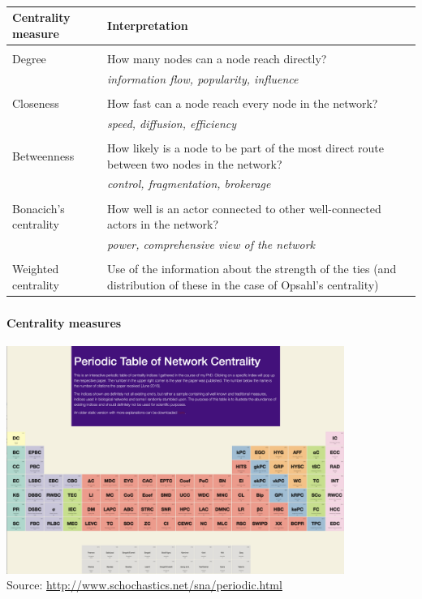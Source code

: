 \documentclass[8pt]{beamer}
\begin{document}
\begin{frame}
\frametitle{\insertsection}
\framesubtitle{\insertsubsection}

\small
\begin{table}
\begin{tabular}{p{3cm}p{7.5cm}}
\toprule
\textbf{Centrality measure} 	&	\textbf{Interpretation} \\
\hline
\\
Degree 		&	How many nodes can a node reach directly?\\
			&	\textit{\color{blue}information flow, popularity, influence}\\
\\
Closeness        &	    How fast can a node reach every node in the network?\\
			&	\textit{\color{blue}speed, diffusion, efficiency}\\
\\
Betweenness        &	How likely is a node to be part of the most direct route between two nodes in the network?\\
			&	\textit{\color{blue}control, fragmentation, brokerage}\\
\\
Bonacich's centrality 	&	How well is an actor connected to other well-connected actors in the network?\\ 
			&	\textit{\color{blue}power, comprehensive view of the network}\\
\\
Weighted centrality     & Use of the information about the strength of the ties (and distribution of these in the case of Opsahl's centrality)\\
\bottomrule
\end{tabular}
\end{table}
\end{frame}


\begin{frame}
\frametitle{\insertsection}
\framesubtitle{Centrality measures}

\centering  
\includegraphics[width=11cm, frame]{periodic}\\
\tiny Source: \url{http://www.schochastics.net/sna/periodic.html}

\end{frame}
\end{document}
